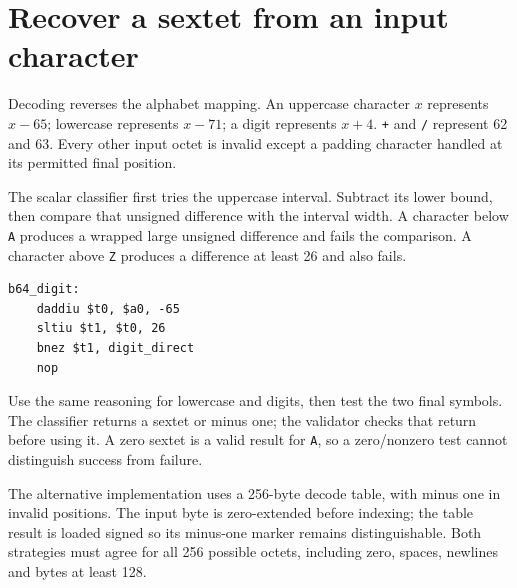 \section{Recover a sextet from an input character}
Decoding reverses the alphabet mapping. An uppercase character \(x\) represents
\(x-65\); lowercase represents \(x-71\); a digit represents \(x+4\).
\texttt{+} and \texttt{/} represent 62 and 63. Every other input octet is invalid
except a padding character handled at its permitted final position.

The scalar classifier first tries the uppercase interval. Subtract its lower bound,
then compare that unsigned difference with the interval width. A character below
\texttt{A} produces a wrapped large unsigned difference and fails the comparison.
A character above \texttt{Z} produces a difference at least 26 and also fails.

\begin{verbatim}
b64_digit:
    daddiu $t0, $a0, -65
    sltiu $t1, $t0, 26
    bnez $t1, digit_direct
    nop
\end{verbatim}

Use the same reasoning for lowercase and digits, then test the two final symbols.
The classifier returns a sextet or minus one; the validator checks that return before
using it. A zero sextet is a valid result for \texttt{A}, so a zero/nonzero test cannot
distinguish success from failure.

The alternative implementation uses a 256-byte decode table, with minus one in invalid
positions. The input byte is zero-extended before indexing; the table result is loaded
signed so its minus-one marker remains distinguishable. Both strategies must agree for
all 256 possible octets, including zero, spaces, newlines and bytes at least 128.
